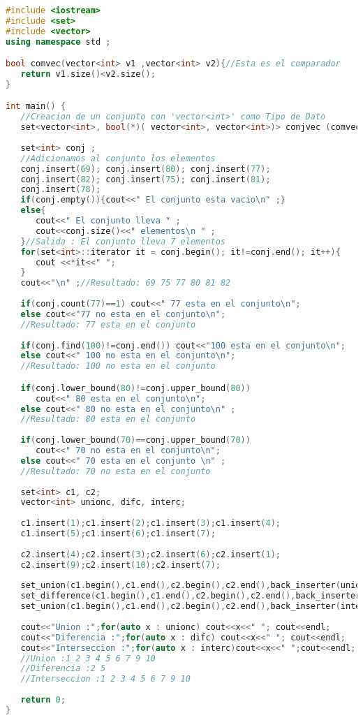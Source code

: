 \begin{lstlisting}[language=C++]
#include <iostream>
#include <set>
#include <vector>
using namespace std ;

bool comvec(vector<int> v1 ,vector<int> v2){//Esta es el comparador
   return v1.size()<v2.size();
}

int main() {
   //Creacion de un conjunto con 'vector<int>' como Tipo de Dato
   set<vector<int>, bool(*)( vector<int>, vector<int>)> conjvec (comvec);
	
   set<int> conj ;
   //Adicionamos al conjunto los elementos
   conj.insert(69); conj.insert(80); conj.insert(77); 
   conj.insert(82); conj.insert(75); conj.insert(81);
   conj.insert(78);
   if(conj.empty()){cout<<" El conjunto esta vacio\n" ;} 
   else{
      cout<<" El conjunto lleva " ;
      cout<<conj.size()<<" elementos\n " ;
   }//Salida : El conjunto lleva 7 elementos
   for(set<int>::iterator it = conj.begin(); it!=conj.end(); it++){
      cout <<*it<<" ";
   } 
   cout<<"\n" ;//Resultado: 69 75 77 80 81 82
   
   if(conj.count(77)==1) cout<<" 77 esta en el conjunto\n";
   else cout<<"77 no esta en el conjunto\n";
   //Resultado: 77 esta en el conjunto
   
   if(conj.find(100)!=conj.end()) cout<<"100 esta en el conjunto\n";
   else cout<<" 100 no esta en el conjunto\n";
   //Resultado: 100 no esta en el conjunto

   if(conj.lower_bound(80)!=conj.upper_bound(80))
      cout<<" 80 esta en el conjunto\n";
   else cout<<" 80 no esta en el conjunto\n" ;
   //Resultado: 80 esta en el conjunto
   
   if(conj.lower_bound(70)==conj.upper_bound(70))
      cout<<" 70 no esta en el conjunto\n";
   else cout<<" 70 esta en el conjunto \n" ;
   //Resultado: 70 no esta en el conjunto
   
   set<int> c1, c2;
   vector<int> unionc, difc, interc;
   
   c1.insert(1);c1.insert(2);c1.insert(3);c1.insert(4);
   c1.insert(5);c1.insert(6);c1.insert(7);
   
   c2.insert(4);c2.insert(3);c2.insert(6);c2.insert(1);
   c2.insert(9);c2.insert(10);c2.insert(7);
   
   set_union(c1.begin(),c1.end(),c2.begin(),c2.end(),back_inserter(unionc));
   set_difference(c1.begin(),c1.end(),c2.begin(),c2.end(),back_inserter(difc));
   set_union(c1.begin(),c1.end(),c2.begin(),c2.end(),back_inserter(interc));
   
   cout<<"Union :";for(auto x : unionc) cout<<x<<" "; cout<<endl;
   cout<<"Diferencia :";for(auto x : difc) cout<<x<<" "; cout<<endl;
   cout<<"Interseccion :";for(auto x : interc)cout<<x<<" ";cout<<endl;
   //Union :1 2 3 4 5 6 7 9 10 
   //Diferencia :2 5 
   //Interseccion :1 2 3 4 5 6 7 9 10
   
   return 0;
}
\end{lstlisting}
